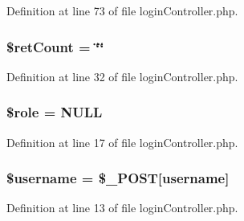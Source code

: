 Definition at line 73 of file login\+Controller.\+php.

\subsubsection[{\texorpdfstring{\$ret\+Count}{$retCount}}]{\setlength{\rightskip}{0pt plus 5cm}\$ret\+Count = \char`\"{}\char`\"{}}\hypertarget{login_controller_8php_abf6d841a145ada2e5b68168ac15e9d1b}{}\label{login_controller_8php_abf6d841a145ada2e5b68168ac15e9d1b}


Definition at line 32 of file login\+Controller.\+php.

\subsubsection[{\texorpdfstring{\$role}{$role}}]{\setlength{\rightskip}{0pt plus 5cm}\$role = N\+U\+LL}\hypertarget{login_controller_8php_a1ea903cca285c7c0b4c9203932100309}{}\label{login_controller_8php_a1ea903cca285c7c0b4c9203932100309}


Definition at line 17 of file login\+Controller.\+php.

\subsubsection[{\texorpdfstring{\$username}{$username}}]{\setlength{\rightskip}{0pt plus 5cm}\$username = \$\+\_\+\+P\+O\+ST\mbox{[}\textquotesingle{}username\textquotesingle{}\mbox{]}}\hypertarget{login_controller_8php_a0eb82aa5f81cf845de4b36cd653c42cf}{}\label{login_controller_8php_a0eb82aa5f81cf845de4b36cd653c42cf}


Definition at line 13 of file login\+Controller.\+php.

